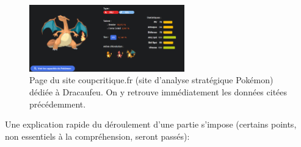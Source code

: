 \documentclass[a4paper,12pt]{article}
\begin{document}
\begin{figure}[!h]
    \centering
    \includegraphics[width=0.6\textwidth]{Image/dracaufeu_coup_critique.png}
    \caption{Page du site coupcritique.fr (site d'analyse stratégique Pokémon)
    dédiée à Dracaufeu. On y retrouve immédiatement les données citées
    précédemment.}
    \label{fig:image2}
\end{figure}

Une explication rapide du déroulement d'une partie s'impose (certains points,
non essentiels à la compréhension, seront passés):
\end{document}
